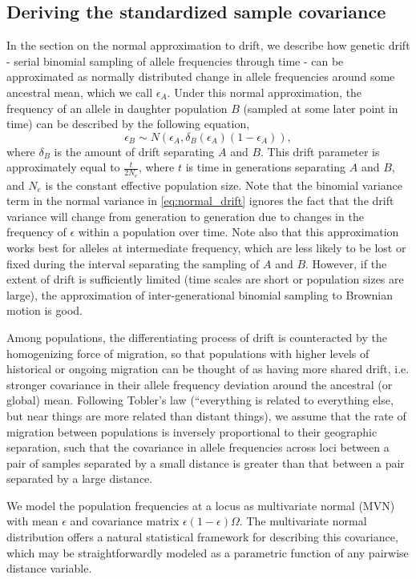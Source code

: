 \documentclass[12pt]{article}
\begin{document}
\subsection*{Deriving the standardized sample covariance}
In the section on the normal approximation to drift, we describe how genetic drift - serial binomial sampling of allele frequencies through time - can be approximated as normally distributed change in allele frequencies around some ancestral mean, which we call $\epsilon_A$.  Under this normal approximation, the frequency of an allele in daughter population $B$ (sampled at some later point in time) can be described by the following equation,
%
\begin{equation}
\label{eq:normal_drift}
\epsilon_B \sim N(\epsilon_A,\delta_B(\epsilon_A)(1-\epsilon_A)),
\end{equation}
%
where $\delta_B$ is the amount of drift separating $A$ and $B$.  This drift parameter is approximately equal to $\frac{t}{2N_e}$, where $t$ is time in generations separating $A$ and $B$, and $N_e$ is the constant effective population size.  Note that the binomial variance term in the normal variance in \eqref{eq:normal_drift} ignores the fact that the drift variance will change from generation to generation due to changes in the frequency of $\epsilon$ within a population over time.  Note also that this approximation works best for alleles at intermediate frequency, which are less likely to be lost or fixed during the interval separating the sampling of $A$ and $B$.  However, if the extent of drift is sufficiently limited (time scales are short or population sizes are large), the approximation of inter-generational binomial sampling to Brownian motion is good.  

Among populations, the differentiating process of drift is counteracted by the homogenizing force of migration, so that populations with higher levels of historical or ongoing migration can be thought of as having more shared drift, i.e. stronger covariance in their allele frequency deviation around the ancestral (or global) mean.  Following Tobler's law (``everything is related to everything else, but near things are more related than distant things), we assume that the rate of migration between populations is inversely proportional to their geographic separation, such that the covariance in allele frequencies across loci between a pair of samples separated by a small distance is greater than that between a pair separated by a large distance.  

We model the population frequencies at a locus as multivariate normal (MVN) with mean $\epsilon$ and covariance matrix $\epsilon(1 - \epsilon)\Omega$.  The multivariate normal distribution offers a natural statistical framework for describing this covariance, which may be straightforwardly modeled as a parametric function of any pairwise distance variable.
\end{document}
